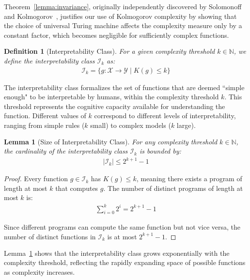 \documentclass[11pt,letter,leqno]{article}
\newtheorem{lemma}[theorem]{Lemma}
\newtheorem{definition}[theorem]{Definition}
\begin{document}
Theorem~\ref{lemma:invariance}, originally independently discovered by Solomonoff and Kolmogorov~\cite{Li2008}, justifies our use of Kolmogorov complexity by showing that the choice of universal Turing machine affects the complexity measure only by a constant factor, which becomes negligible for sufficiently complex functions.

\begin{definition}[Interpretability Class]
\label{def:interpretability-class}
For a given complexity threshold $k \in \mathbb{N}$, we define the interpretability class $\mathcal{I}_k$ as:
\begin{align}
\mathcal{I}_k = \{g : \mathcal{X} \rightarrow \mathcal{Y} \mid K(g) \leq k\}
\end{align}
\end{definition}

The interpretability class formalizes the set of functions that are deemed ``simple enough" to be interpretable by humans, within the complexity threshold $k$. This threshold represents the cognitive capacity available for understanding the function.  Different values of $k$ correspond to different levels of interpretability, ranging from simple rules ($k$ small) to complex models ($k$ large).

\begin{lemma}[Size of Interpretability Class]
\label{thm:size-interpretability}
For any complexity threshold $k \in \mathbb{N}$, the cardinality of the interpretability class $\mathcal{I}_k$ is bounded by:
\begin{align}
|\mathcal{I}_k| \leq 2^{k+1} - 1
\end{align}
\end{lemma}

\begin{proof}
Every function $g \in \mathcal{I}_k$ has $K(g) \leq k$, meaning there exists a program of length at most $k$ that computes $g$.  The number of distinct programs of length at most $k$ is:
\begin{align}
\sum_{i=0}^{k} 2^i = 2^{k+1} - 1
\end{align}

Since different programs can compute the same function but not vice versa, the number of distinct functions in $\mathcal{I}_k$ is at most $2^{k+1} - 1$.
\end{proof}

Lemma~\ref{thm:size-interpretability} shows that the interpretability class grows exponentially with the complexity threshold, reflecting the rapidly expanding space of possible functions as complexity increases.
\end{document}
